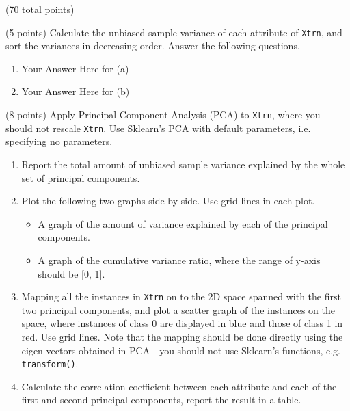 \documentclass[12pt]{article}
\begin{document}
\begin{question}{(70 total points) \qOneTitle}
\begin{subquestion}{(5 points)
    Calculate the unbiased sample variance of each attribute of {\tt Xtrn}, and sort the variances in decreasing order. Answer the following questions.
  }
  \begin{answerbox}{0.5\textheight}
    \begin{enumerate}
    \item Your Answer Here for (a)
    \item Your Answer Here for (b)
    \end{enumerate}
  \end{answerbox}
  


\end{subquestion}

\begin{subquestion}{(8 points)
    Apply Principal Component Analysis (PCA) to {\tt Xtrn}, where you should not rescale {\tt Xtrn}.
    Use Sklearn's PCA with default parameters, i.e. specifying no parameters.
  }\label{q1:pca:wo/s}
  \begin{enumerate}\NARROWITEM
  \item Report the total amount of unbiased sample variance explained by the whole set of principal components.
  \item Plot the following two graphs side-by-side. Use grid lines in each plot.
    \begin{itemize}\NARROWITEM
    \item A graph of the amount of variance explained by each of the principal components.
    \item A graph of the cumulative variance ratio, where the range of y-axis should be [0, 1].
    \end{itemize}
  \item Mapping all the instances in {\tt Xtrn} on to the 2D space spanned with the first two principal components, and plot a scatter graph of the instances on the space, where instances of class 0 are displayed in blue and those of class 1 in red. Use grid lines. Note that the mapping should be done directly using the eigen vectors obtained in PCA - you should not use Sklearn's functions, e.g. {\tt transform()}. 
  \item Calculate the correlation coefficient between each attribute and each of the first and second principal components, report the result in a table.
  \end{enumerate}
   


\end{subquestion}
\end{question}
\end{document}
